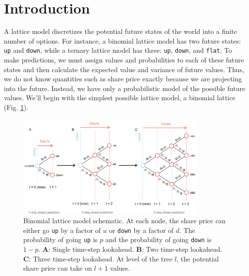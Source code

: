 \documentclass[11pt]{article}
\theoremstyle{definition}
\begin{document}


\section*{Introduction}
A lattice model discretizes the potential future states of the world into a finite number of options. 
For instance, a binomial lattice model has two future states: \texttt{up} and \texttt{down}, while a ternary lattice model has three: \texttt{up}, \texttt{down}, and \texttt{flat}. 
To make predictions, we must assign values and probabilities to each of these future states and then calculate the expected value and variance of future values. 
Thus, we do not know quantities such as share price exactly because we are projecting into the future. Instead, we have only a probabilistic model of the possible future values. 
We'll begin with the simplest possible lattice model, a binomial lattice (Fig. \ref{fig:binomial-lattice-schematic}).
\begin{figure}[h]
    \centering
    \includegraphics[width=0.85\textwidth]{./figs/Fig-Binomial-LatticeModels-Schematic.pdf}
    \caption{Binomial lattice model schematic. 
	At each node, the share price can either go \texttt{up} by a factor of $u$ or \texttt{down} by a factor of $d$. 
	The probability of going \texttt{up} is $p$ and the probability of going \texttt{down} is $1-p$. 
	\textbf{A}: Single time-step lookahead.
	\textbf{B}: Two time-step lookahead.
	\textbf{C}: Three time-step lookahead.
	At level of the tree $l$, the potential share price can take on $l+1$ values.
	}\label{fig:binomial-lattice-schematic}
\end{figure}
\end{document}
